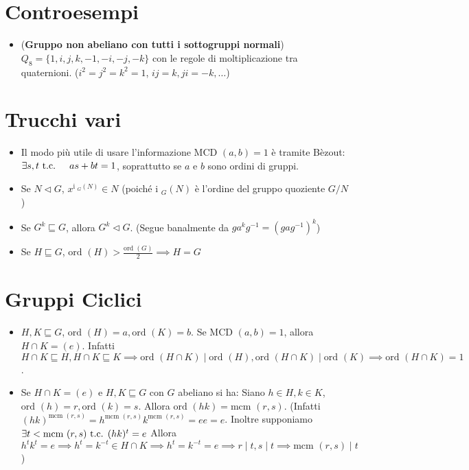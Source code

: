 \documentclass[a4paper,NoNotes,GeneralMath]{stdmdoc}
\newcommand{\Ord}{\text{ord }}
\newcommand{\sgr}{\sqsubseteq}
\newcommand{\nrm}{\lhd}
\newcommand{\Ind}{\text{i }}
\newcommand{\MCD}{\text{MCD }}
\newcommand{\mcm}{\text{mcm }}
\begin{document}
	\section*{Controesempi}
	\begin{itemize}
		\item ({\bf Gruppo non abeliano con tutti i sottogruppi normali}) $Q_8 = \{1, i, j, k, -1, -i, -j, -k\}$ con le regole di moltiplicazione tra quaternioni. ($i^2 = j^2 = k^2 = 1$, $ij = k, ji = -k, \ldots$)
	\end{itemize}

	\section*{Trucchi vari}
	\begin{itemize}
		\item Il modo più utile di usare l'informazione $\MCD(a, b) = 1$ è tramite Bèzout: $\exists s, t \mbox{ t.c. } \quad as + bt = 1$, soprattutto se $a$ e $b$ sono ordini di gruppi.
		\item Se $N \nrm G$, $x^{\Ind_G(N)} \in N$ (poiché $\Ind_G(N)$ è l'ordine del gruppo quoziente $G/N$)
		\item Se $G^k \sgr G$, allora $G^k \nrm G$. (Segue banalmente da $ga^k g^{-1} = (gag^{-1})^k$)
		\item Se $H \sgr G$, $\Ord(H) > \frac{\Ord(G)}{2} \implies H = G$
	\end{itemize}

	\section*{Gruppi Ciclici}
	\begin{itemize}
		\item $H, K \sgr G$, $\Ord(H) = a, \Ord(K) = b$. Se $\MCD(a,b) =1$, allora $H \cap K = (e)$. Infatti $H \cap K \sgr H, H\cap K \sgr K \implies \Ord(H\cap K) \mid \Ord(H), \Ord(H\cap K) \mid \Ord(K) \implies \Ord(H \cap K) = 1$.
		\item Se $H \cap K = (e)$ e $H, K \sgr G$ con $G$ abeliano si ha: Siano $h \in H, k \in K$, $\Ord(h) = r, \Ord(k) = s$. Allora $\Ord(hk) = \mcm(r,s)$. (Infatti $(hk)^{\mcm(r,s)} = h^{\mcm(r,s)} k^{\mcm(r,s)} = e e = e$. Inoltre supponiamo $\exists t < \mcm(r,s) \tc (hk)^t = e$ Allora $h^t k^t = e \implies h^t = k^{-t} \in H \cap K \implies h^t = k^{-t} = e \implies r\mid t, s \mid t \implies \mcm(r,s) \mid t$)
	\end{itemize}
\end{document}
